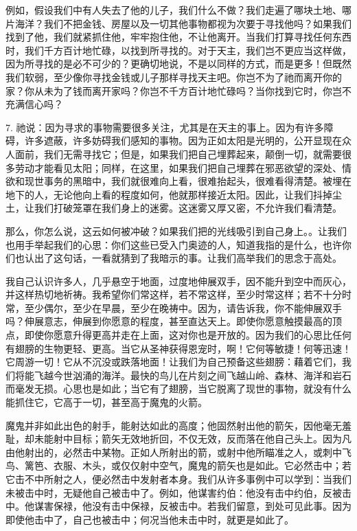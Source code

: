 例如，假设我们中有人失去了他的儿子，我们什么不做？我们走遍了哪块土地、哪片海洋？我们不把金钱、房屋以及一切其他事物都视为次要于寻找他吗？如果我们找到了他，我们就紧抓住他，牢牢抱住他，不让他离开。当我们打算寻找任何东西时，我们千方百计地忙碌，以找到所寻找的。对于天主，我们岂不更应当这样做，因为所寻找的是必不可少的？更确切地说，不是以同样的方式，而是更多！但既然我们软弱，至少像你寻找金钱或儿子那样寻找天主吧。你岂不为了祂而离开你的家？你从未为了钱而离开家吗？你岂不千方百计地忙碌吗？当你找到它时，你岂不充满信心吗？\par

7. 祂说：因为寻求的事物需要很多关注，尤其是在天主的事上。因为有许多障碍，许多遮蔽，许多妨碍我们感知的事物。因为正如太阳是光明的，公开显现在众人面前，我们无需寻找它；但是，如果我们把自己埋葬起来，颠倒一切，就需要很多劳动才能看见太阳；同样，在这里，如果我们把自己埋葬在邪恶欲望的深处、情欲和现世事务的黑暗中，我们就很难向上看，很难抬起头，很难看得清楚。被埋在地下的人，无论他向上看的程度如何，他就那样接近太阳。因此，让我们抖掉尘土，让我们打破笼罩在我们身上的迷雾。这迷雾又厚又密，不允许我们看清楚。\par

那么，你怎么说，这云如何被冲破？如果我们把的光线吸引到自己身上。。让我们也用手举起我们的心思：你们这些已受入门奥迹的人，知道我指的是什么，也许你们也认出了这句话，一看就猜到了我暗示的事。让我们高举我们的思念于高处。\par

我自己认识许多人，几乎悬空于地面，过度地伸展双手，因不能升到空中而灰心，并这样热切地祈祷。我希望你们常这样，若不常这样，至少时常这样；若不十分时常，至少偶尔，至少在早晨，至少在晚祷中。因为，请告诉我，你不能伸展双手吗？伸展意志，伸展到你愿意的程度，甚至直达天上。即使你愿意触摸最高的顶点，即使你愿意升得更高并走在上面，这对你也是开放的。因为我们的心思比任何有翅膀的生物更轻、更高。当它从圣神获得恩宠时，啊！它何等敏捷！何等迅速！它周游一切！它从不沉没或跌落地面！让我们为自己预备这些翅膀：藉着它们，我们将能飞越今世汹涌的海洋。最快的鸟儿在片刻之间飞越山岭、森林、海洋和岩石而毫发无损。心思也是如此；当它有了翅膀，当它脱离了现世的事物，就没有什么能抓住它，它高于一切，甚至高于魔鬼的火箭。\par

魔鬼并非如此出色的射手，能射达如此的高度；他固然射出他的箭矢，因他毫无羞耻，却未能射中目标；箭矢无效地折回，不仅无效，反而落在他自己头上。因为凡由他射出的，必然击中某物。正如人所射出的箭，或射中他所瞄准之人，或刺中飞鸟、篱笆、衣服、木头，或仅仅射中空气，魔鬼的箭矢也是如此。它必然击中；若它击不中所射之人，便必然击中发射者本身。我们从许多事例中可以学到：当我们未被击中时，无疑他自己被击中了。例如，他谋害约伯：他没有击中约伯，反被击中。他谋害保禄，他没有击中保禄，反被击中。若我们留意，到处可见此事。因为即使他击中了，自己也被击中；何况当他未击中时，就更是如此了。\par

